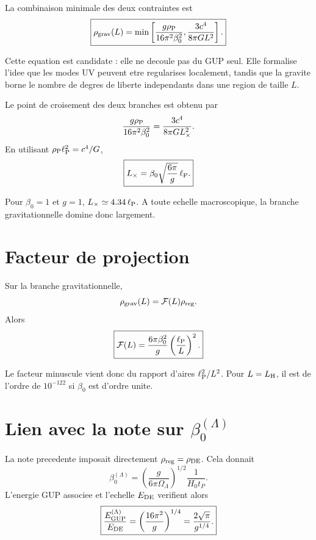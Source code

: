 \documentclass[11pt,a4paper]{article}
\newcommand{\lp}{\ell_{\rm P}}
\newcommand{\rhoP}{\rho_{\rm P}}
\newcommand{\rhoDE}{\rho_{\rm DE}}
\newcommand{\LH}{L_{\rm H}}
\newcommand{\rhoreg}{\rho_{\rm reg}}
\begin{document}
La combinaison minimale des deux contraintes est
\begin{equation}
\boxed{
\rho_{\rm grav}(L)
=
\min\left[
\frac{g\rhoP}{16\pi^2\beta_0^2},
\frac{3c^4}{8\pi G L^2}
\right].
}
\label{eq:min_density}
\end{equation}

Cette equation est candidate : elle ne decoule pas du GUP seul. Elle formalise
l'idee que les modes UV peuvent etre regularises localement, tandis que la
gravite borne le nombre de degres de liberte independants dans une region de
taille $L$.

Le point de croisement des deux branches est obtenu par
\begin{equation}
\frac{g\rhoP}{16\pi^2\beta_0^2}
=
\frac{3c^4}{8\pi G L_\times^2}.
\end{equation}
En utilisant $\rhoP\lp^2=c^4/G$,
\begin{equation}
\boxed{
L_\times
=
\beta_0\sqrt{\frac{6\pi}{g}}\,\lp.
}
\label{eq:L_cross}
\end{equation}

Pour $\beta_0=1$ et $g=1$, $L_\times\simeq4.34\,\lp$. A toute echelle
macroscopique, la branche gravitationnelle domine donc largement.

\section{Facteur de projection}

Sur la branche gravitationnelle,
\begin{equation}
\rho_{\rm grav}(L)=\mathcal{F}(L)\rhoreg.
\end{equation}
Alors
\begin{equation}
\boxed{
\mathcal{F}(L)
=
\frac{6\pi\beta_0^2}{g}
\left(\frac{\lp}{L}\right)^2.
}
\label{eq:projection_factor}
\end{equation}

Le facteur minuscule vient donc du rapport d'aires $\lp^2/L^2$. Pour $L=\LH$,
il est de l'ordre de $10^{-122}$ si $\beta_0$ est d'ordre unite.

\section{\texorpdfstring{Lien avec la note sur $\beta_0^{(\Lambda)}$}{Lien avec la note sur beta0 Lambda}}

La note precedente imposait directement $\rhoreg=\rhoDE$. Cela donnait
\begin{equation}
\beta_0^{(\Lambda)}
=
\left(\frac{g}{6\pi\Omega_\Lambda}\right)^{1/2}
\frac{1}{H_0t_P}.
\end{equation}
L'energie GUP associee et l'echelle $E_{\rm DE}$ verifient alors
\begin{equation}
\boxed{
\frac{E_{\rm GUP}^{(\Lambda)}}{E_{\rm DE}}
=
\left(\frac{16\pi^2}{g}\right)^{1/4}
=
\frac{2\sqrt{\pi}}{g^{1/4}}.
}
\label{eq:energy_ratio}
\end{equation}
\end{document}
